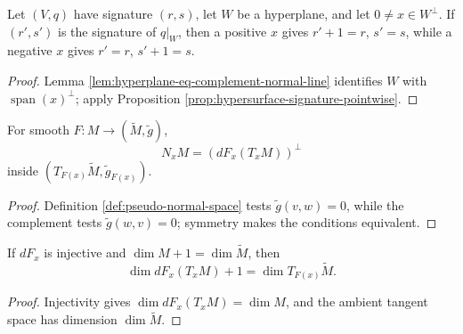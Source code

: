 \begin{proposition}
\label{prop:hypersurface-signature-pointwise-hyperplane}





Let $(V,q)$ have signature $(r,s)$, let $W$ be a hyperplane, and let $0\ne x\in W^\perp$. If $(r',s')$ is the signature of $q|_W$, then a positive $x$ gives $r'+1=r$, $s'=s$, while a negative $x$ gives $r'=r$, $s'+1=s$.
\end{proposition}
\begin{proof}

\sketch Lemma \ref{lem:hyperplane-eq-complement-normal-line} identifies $W$ with $\operatorname{span}(x)^\perp$; apply Proposition \ref{prop:hypersurface-signature-pointwise}.
\end{proof}

\begin{lemma}
\label{lem:pseudo-normal-space-eq-orthogonal}





For smooth $F:M\to(\widetilde M,\widetilde g)$,
\[
N_xM=(dF_x(T_xM))^\perp
\]
inside $(T_{F(x)}\widetilde M,\widetilde g_{F(x)})$.
\end{lemma}
\begin{proof}

\sketch Definition \ref{def:pseudo-normal-space} tests $\widetilde g(v,w)=0$, while the complement tests $\widetilde g(w,v)=0$; symmetry makes the conditions equivalent.
\end{proof}

\begin{lemma}
\label{lem:hypersurface-tangent-hyperplane}




If $dF_x$ is injective and $\dim M+1=\dim\widetilde M$, then
\[
\dim dF_x(T_xM)+1=\dim T_{F(x)}\widetilde M.
\]
\end{lemma}
\begin{proof}

\sketch Injectivity gives $\dim dF_x(T_xM)=\dim M$, and the ambient tangent space has dimension $\dim\widetilde M$.
\end{proof}


